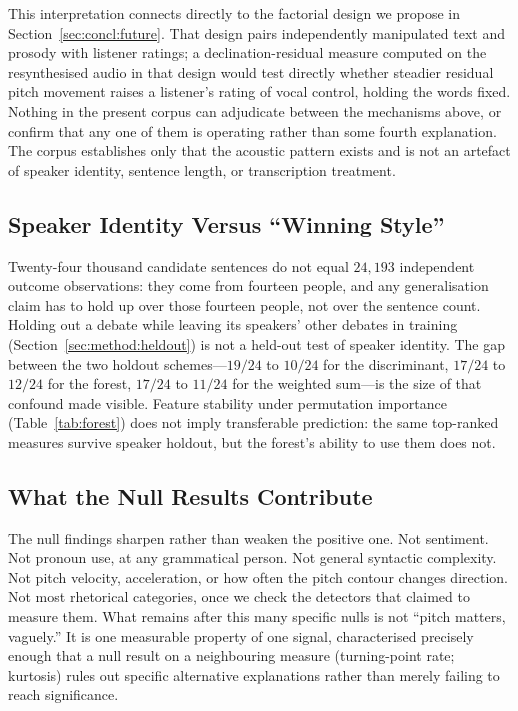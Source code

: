 \documentclass[journal]{IEEEtran}
\begin{document}
This interpretation connects directly to the factorial design we propose in
Section~\ref{sec:concl:future}. That design pairs independently manipulated
text and prosody with listener ratings; a declination-residual measure
computed on the resynthesised audio in that design would test directly
whether steadier residual pitch movement raises a listener's rating of
vocal control, holding the words fixed. Nothing in the present corpus can
adjudicate between the mechanisms above, or confirm that any one of them is
operating rather than some fourth explanation. The corpus establishes only
that the acoustic pattern exists and is not an artefact of speaker identity,
sentence length, or transcription treatment.

\subsection{Speaker Identity Versus ``Winning Style''}
\label{sec:disc:identity}

Twenty-four thousand candidate sentences do not equal $24{,}193$ independent
outcome observations: they come from fourteen people, and any
generalisation claim has to hold up over those fourteen people, not over
the sentence count. Holding out a debate while leaving its speakers' other
debates in training (Section~\ref{sec:method:heldout}) is not a held-out
test of speaker identity. The gap between the two holdout schemes---$19/24$
to $10/24$ for the discriminant, $17/24$ to $12/24$ for the forest, $17/24$
to $11/24$ for the weighted sum---is the size of that confound made
visible. Feature stability under permutation importance
(Table~\ref{tab:forest}) does not imply transferable prediction: the same
top-ranked measures survive speaker holdout, but the forest's ability to
use them does not.

\subsection{What the Null Results Contribute}
\label{sec:disc:nulls}

The null findings sharpen rather than weaken the positive one. Not
sentiment. Not pronoun use, at any grammatical person. Not general
syntactic complexity. Not pitch velocity, acceleration, or how often the
pitch contour changes direction. Not most rhetorical categories, once we
check the detectors that claimed to measure them. What remains after this
many specific nulls is not ``pitch matters, vaguely.'' It is one measurable
property of one signal, characterised precisely enough that a null result
on a neighbouring measure (turning-point rate; kurtosis) rules out specific
alternative explanations rather than merely failing to reach significance.
\end{document}
